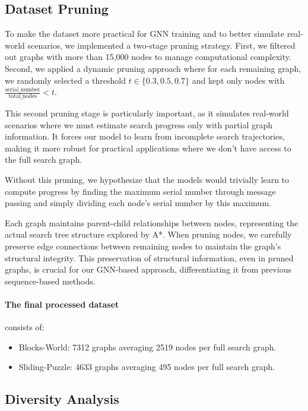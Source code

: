 \documentclass[letterpaper]{article}
\begin{document}
\subsection{Dataset Pruning}

To make the dataset more practical for GNN training and to better simulate real-world scenarios, we implemented a two-stage pruning strategy. First, we filtered out graphs with more than 15,000 nodes to manage computational complexity. Second, we applied a dynamic pruning approach where for each remaining graph, we randomly selected a threshold $t \in \{0.3, 0.5, 0.7\}$ and kept only nodes with $\frac{\text{serial\_number}}{\text{total\_nodes}} < t$.

This second pruning stage is particularly important, as it simulates real-world scenarios where we must estimate search progress only with partial graph information. It forces our model to learn from incomplete search trajectories, making it more robust for practical applications where we don't have access to the full search graph. 

Without this pruning, we hypothesize that the models would trivially learn to compute progress by finding the maximum serial number through message passing and simply dividing each node's serial number by this maximum. 

Each graph maintains parent-child relationships between nodes, representing the actual search tree structure explored by A*. When pruning nodes, we carefully preserve edge connections between remaining nodes to maintain the graph's structural integrity. This preservation of structural information, even in pruned graphs, is crucial for our GNN-based approach, differentiating it from previous sequence-based methods.

\paragraph{The final processed dataset} consists of:
\begin{itemize}
    \item Blocks-World: 7312 graphs averaging 2519 nodes per full search graph.
    \item Sliding-Puzzle: 4633 graphs averaging 495 nodes per full search graph.
\end{itemize}


\subsection{Diversity Analysis}
\end{document}
